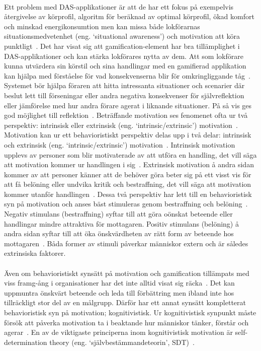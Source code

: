 \paragraph{}
\hspace{-12pt}Ett problem med DAS-applikationer är att de har ett fokus på exempelvis återgivelse av körprofil, algoritm för beräknad av optimal körprofil, ökad komfort och minskad energikonsumtion men kan missa både lokförarnas situationsmedvetenhet (eng. \lq{}situational awareness\rq{}) och motivation att köra punktligt~\cite{Bae2014, Cwil2018}.
Det har visat sig att gamification-element har bra tillämplighet i DAS-applikationer och kan stärka lokförares nytta av dem.
Att som lokförare kunna utvärdera sin körstil och sina handlingar med en gamifierad applikation kan hjälpa med förståelse för vad konsekvenserna blir för omkringliggande tåg~\cite{Bae2014}.
Systemet bör hjälpa föraren att hitta intressanta situationer och scenarier där beslut lett till förseningar eller andra negativa konsekvenser för självreflektion eller jämförelse med hur andra förare agerat i liknande situationer.
På så vis ges god möjlighet till reflektion~\cite{Bae2014}.
Beträffande motivation ses fenomenet ofta ur två perspektiv: intrinsisk eller extrinsisk (eng. \lq{}intrinsic/extrinsic\rq{}) motivation~\cite{Cwil2018}.
Motivation kan ur ett behavioristiskt perspektiv delas upp i två delar: intrinsisk och extrinsisk (eng. \lq{}intrinsic/extrinsic\rq{}) motivation~\cite{Cwil2018}.
Intrinsisk motivation upplevs av personer som blir motivaterade av att utföra en handling, det vill säga att motivation kommer ur handlingen i sig~\cite{Cwil2018}.
Extrinsisk motivation å andra sidan kommer av att personer känner att de behöver göra beter sig på ett visst vis för att få belöning eller undvika kritik och bestraffning, det vill säga att motivation kommer utanför handlingen~\cite{Cwil2018}.
Dessa två perspektiv har lett till en behavioristisk syn på motivation och anses bäst stimuleras genom bestraffning och belöning~\cite{Cwil2018}.
Negativ stimulans (bestraffning) syftar till att göra oönskat beteende eller handlingar mindre attraktiva för mottagaren.
Positiv stimulans (belöning) å andra sidan syftar till att öka önskvärdheten av rätt form av beteende hos mottagaren~\cite{Cwil2018}.
Båda former av stimuli påverkar människor extern och är således extrinsiska faktorer.
\paragraph{}
\hspace{-12pt}Även om behavioristiskt synsätt på motivation och gamification tillämpats med viss framg-ång i organisationer har det inte alltid visat sig räcka~\cite{Cwil2018}.
Det kan uppmuntra önskvärt beteende och leda till förbättring men ibland inte hos tillräckligt stor del av en målgrupp.
Därför har ett annat synsätt kompletterat behavioristisk syn på motivation; kognitivistisk.
Ur kognitivistisk synpunkt måste försök att påverka motivation ta i beaktande hur människor tänker, förstår och agerar~\cite{Cwil2018}.
En av de viktigaste principerna inom kognitivistisk motivation är self-determination theory (eng. \lq{}självbestämmandeteorin\rq{}, SDT)~\cite{Cwil2018}.
